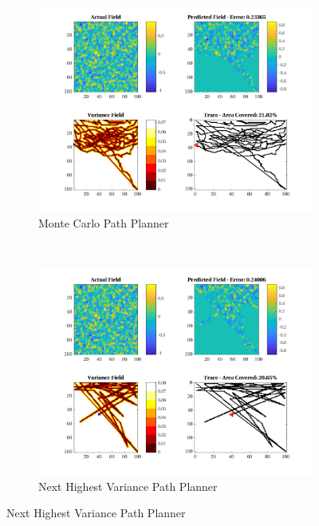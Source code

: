 \begin{figure}[htb!]
    \centering
    \begin{subfigure}[t]{0.5\textwidth}
        \centering
        \includegraphics[width=\linewidth]{figures/hbresults/mc_20p_100x100_sf_1_seed_3.png}
        \captionsetup{skip=0.10\baselineskip,size=footnotesize}
        \caption{Monte Carlo Path Planner}
    \end{subfigure}%
    ~ 
    \begin{subfigure}[t]{0.5\textwidth}
        \centering
        \includegraphics[width=\linewidth]{figures/hbresults/nhv_20p_100x100_sf_1_seed_3.png}
        \captionsetup{skip=0.10\baselineskip,size=footnotesize}
        \caption{Next Highest Variance Path Planner}

\end{subfigure}
\end{figure}
